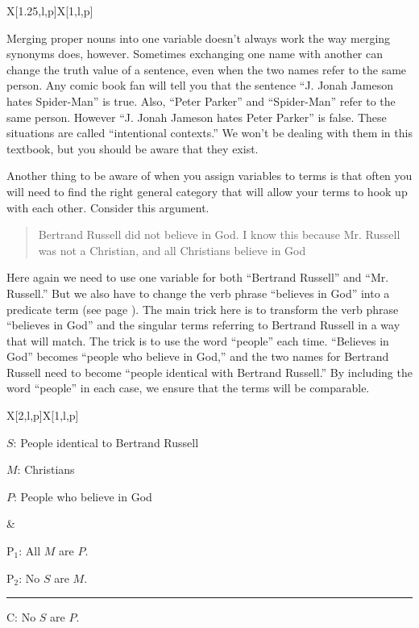 {\begin{tabu}{{X[1.25,l,p]X[1,l,p]}}
\end{tabu}

Merging proper nouns into one variable doesn't always work the way merging synonyms does, however. Sometimes exchanging one name with another can change the truth value of a sentence, even when the two names refer to the same person. Any comic book fan will tell you that the sentence ``J. Jonah Jameson hates Spider-Man'' is true. Also, ``Peter Parker'' and ``Spider-Man'' refer to the same person. However ``J. Jonah Jameson hates Peter Parker'' is false. These situations are called ``intentional contexts.'' We won't be dealing with them in this textbook, but you should be aware that they exist. 

Another thing to be aware of when you assign variables to terms is that often you will need to find the right general category that will allow your terms to hook up with each other. \label{finding_general_terms} Consider this argument.

\begin{quotation}
Bertrand Russell did not believe in God. I know this because Mr. Russell was not a Christian, and all Christians believe in God
\end{quotation}

Here again we need to use one variable for both ``Bertrand Russell'' and ``Mr. Russell.'' But we also have to change the verb phrase ``believes in God'' into a predicate term (see page \pageref{subsec:nonstandard_verbs}). The main trick here is to transform the verb phrase ``believes in God'' and the singular terms referring to Bertrand Russell in a way that will match. The trick is to use the word ``people'' each time. ``Believes in God'' becomes ``people who believe in God,'' and the two names for Bertrand Russell need to become ``people identical with Bertrand Russell.'' By including the word ``people'' in each case, we ensure that the terms will be comparable. 
 
\begin{tabu}{{X[2,l,p]X[1,l,p]}}

\begin{ekey}
\item[$S$:] People identical to Bertrand Russell
\item[$M$:] Christians
\item[$P$:] People who believe in God
\end{ekey}

&

\begin{earg}
\item[P$_1$:] All $M$ are $P$.
\item[P$_2$:] No $S$ are $M$.
\vspace{-.5em}
\item [] \rule{0.5\linewidth}{.5pt} 
\item[C:] No $S$ are $P$.
\end{earg} 


\end{tabu}}

